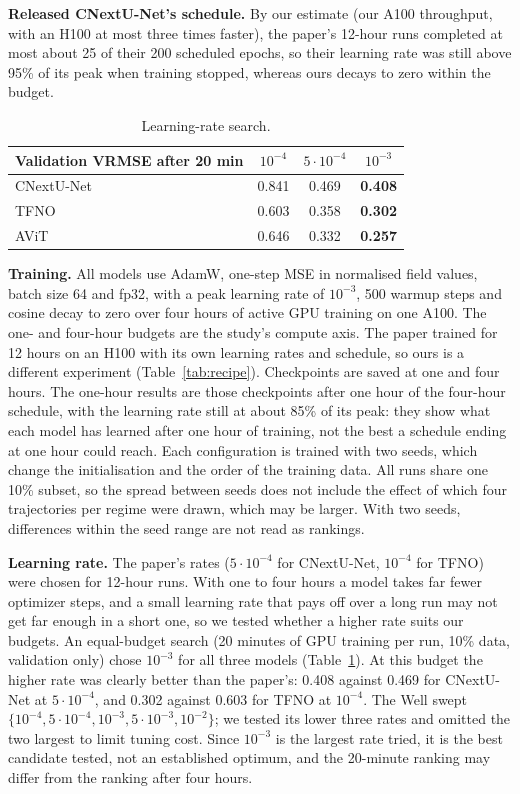 \documentclass[11pt]{article}
\begin{document}
\textbf{Released CNextU-Net's schedule.} By our estimate (our A100 throughput, with an H100 at most three times faster), the
paper's 12-hour runs completed at most about 25 of their 200 scheduled epochs, so their learning rate was still
above 95\% of its peak when training stopped, whereas ours decays to zero within the budget.

\begin{table}[!htbp]
\centering\small
\begin{tabular}{@{}lccc@{}}
\toprule
Validation VRMSE after 20 min & $10^{-4}$ & $5\cdot10^{-4}$ & $10^{-3}$ \\
\midrule
CNextU-Net & 0.841 & 0.469 & \textbf{0.408} \\
TFNO & 0.603 & 0.358 & \textbf{0.302} \\
AViT & 0.646 & 0.332 & \textbf{0.257} \\
\bottomrule
\end{tabular}
\caption{Learning-rate search.}
\label{tab:lr}
\end{table}

\textbf{Training.} All models use AdamW, one-step MSE in normalised field values, batch size 64 and fp32, with a
peak learning rate of $10^{-3}$, 500 warmup steps and cosine decay to zero over four hours of active GPU training
on one A100. The one- and four-hour budgets are the study's compute axis. The paper trained for 12 hours on an
H100 with its own learning rates and schedule, so ours is a different experiment (Table~\ref{tab:recipe}).
Checkpoints are saved at one and four hours. The one-hour
results are those checkpoints after one hour of the four-hour schedule, with the learning rate still at about 85\%
of its peak: they show what each model has learned after one hour of training, not the best a schedule ending at
one hour could reach. Each configuration is trained with two seeds, which change the initialisation and the order
of the training data. All runs share one 10\% subset, so the spread between seeds does not include the effect of
which four trajectories per regime were drawn, which may be larger. With two seeds, differences within the seed
range are not read as rankings.

\textbf{Learning rate.} The paper's rates ($5\cdot10^{-4}$ for CNextU-Net, $10^{-4}$ for TFNO) were chosen for
12-hour runs. With one to four hours a model takes far fewer optimizer steps, and a small learning rate that pays off
over a long run may not get far enough in a short one, so we tested whether a higher rate suits our budgets. An
equal-budget search (20 minutes of GPU training per run, 10\% data, validation only) chose $10^{-3}$ for all three
models (Table~\ref{tab:lr}). At this budget the higher rate was clearly better than the paper's: 0.408 against 0.469
for CNextU-Net at $5\cdot10^{-4}$, and 0.302 against 0.603 for TFNO at $10^{-4}$. The Well swept $\{10^{-4}, 5\cdot10^{-4}, 10^{-3},
5\cdot10^{-3}, 10^{-2}\}$; we tested its lower three rates and omitted the two largest to limit tuning cost. Since
$10^{-3}$ is the largest rate tried, it is the best candidate tested, not an established optimum, and the
20-minute ranking may differ from the ranking after four hours.
\end{document}

